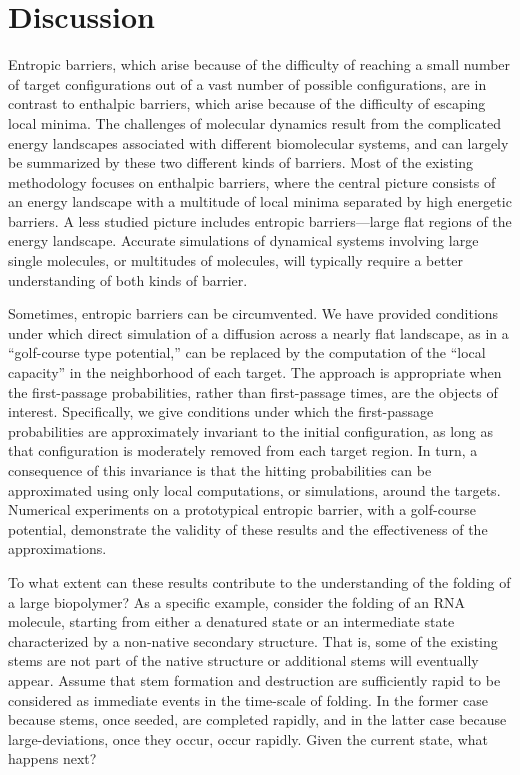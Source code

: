 \documentclass[nofootinbib,english, aip, jcp, priprint, graphicx,floatfix]{revtex4-1}
\theoremstyle{plain}
\theoremstyle{definition}
\theoremstyle{plain}
\begin{document}
\section{Discussion} 
\label{sec:Discussion}


Entropic barriers, which arise because of the difficulty of reaching a small number of target configurations out of a vast number of possible configurations, are in contrast to enthalpic barriers, which arise because of the difficulty of escaping local minima. The challenges of molecular dynamics result from the complicated energy landscapes associated with different biomolecular systems, and can largely be summarized by these two different kinds of barriers. Most of the existing methodology focuses on enthalpic barriers, where the central picture consists of an energy landscape with a multitude of local minima separated by high energetic barriers. A less studied picture includes entropic barriers---large 
flat regions of the energy landscape. Accurate simulations of  dynamical systems involving large single molecules, or multitudes of molecules, will typically require a better understanding of both kinds of barrier.

Sometimes, entropic barriers can be circumvented. We have provided conditions under which direct simulation of a diffusion across a nearly flat landscape, as in a ``golf-course type potential,'' can be 
replaced by the computation of the ``local capacity'' in the neighborhood of each target. The approach is appropriate when the first-passage probabilities, rather than first-passage times, are the objects of interest. Specifically, we give conditions 
under which the first-passage probabilities are approximately invariant to the initial configuration, as long as that configuration is moderately removed from each target region. In turn, a consequence of this invariance is that the hitting probabilities can be approximated using only local computations, or simulations, around the targets.  Numerical experiments on a prototypical entropic barrier, with a golf-course potential, demonstrate the validity of these results and the effectiveness of the approximations.

To what extent can these results contribute to the understanding of the folding of a large biopolymer? As a specific example, consider the folding of an RNA molecule, starting from either a denatured state or an intermediate state characterized by a non-native secondary structure. That is, some of the existing stems are not part of the native structure or additional stems will eventually appear. Assume that stem formation and destruction are sufficiently rapid to be considered as immediate events in the time-scale of folding. In the former case because stems, once seeded, are completed 
rapidly\cite{Porschke1977-xz}, and in the latter case because large-deviations, once they occur, occur rapidly. 
Given the current state, what happens next? 
\end{document}
